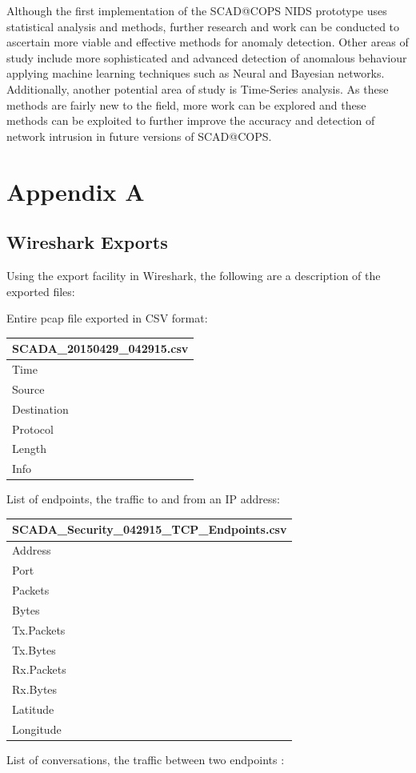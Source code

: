 \documentclass[12pt,]{article}
\begin{document}
Although the first implementation of the SCAD@COPS NIDS prototype uses
statistical analysis and methods, further research and work can be
conducted to ascertain more viable and effective methods for anomaly
detection. Other areas of study include more sophisticated and advanced
detection of anomalous behaviour applying machine learning techniques
such as Neural and Bayesian networks. Additionally, another potential
area of study is Time-Series analysis. As these methods are fairly new
to the field, more work can be explored and these methods can be
exploited to further improve the accuracy and detection of network
intrusion in future versions of SCAD@COPS.

\pagebreak

\section*{Appendix A}\label{appendix-a}

\subsection*{Wireshark Exports}\label{wireshark-exports}

Using the export facility in Wireshark, the following are a description
of the exported files:

Entire pcap file exported in CSV format:

\begin{longtable}[c]{@{}l@{}}
\toprule
SCADA\_20150429\_042915.csv\tabularnewline
\midrule
\endhead
Time\tabularnewline
Source\tabularnewline
Destination\tabularnewline
Protocol\tabularnewline
Length\tabularnewline
Info\tabularnewline
\bottomrule
\end{longtable}

List of endpoints, the traffic to and from an IP address:

\begin{longtable}[c]{@{}l@{}}
\toprule
SCADA\_Security\_042915\_TCP\_Endpoints.csv\tabularnewline
\midrule
\endhead
Address\tabularnewline
Port\tabularnewline
Packets\tabularnewline
Bytes\tabularnewline
Tx.Packets\tabularnewline
Tx.Bytes\tabularnewline
Rx.Packets\tabularnewline
Rx.Bytes\tabularnewline
Latitude\tabularnewline
Longitude\tabularnewline
\bottomrule
\end{longtable}

List of conversations, the traffic between two endpoints :
\end{document}
